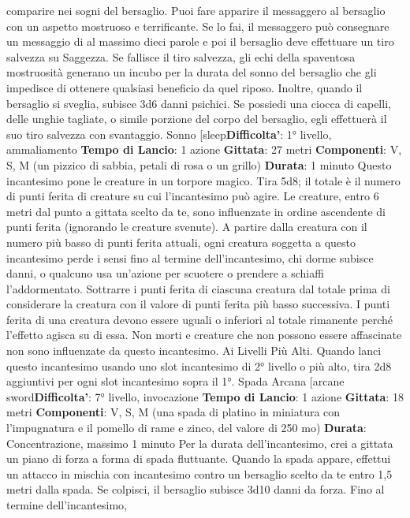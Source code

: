 \begin{multicols}{2}
comparire nei sogni del bersaglio.
Puoi fare apparire il messaggero al bersaglio con un
aspetto mostruoso e terrificante. Se lo fai, il
messaggero può consegnare un messaggio di al
massimo dieci parole e poi il bersaglio deve effettuare
un tiro salvezza su Saggezza. Se fallisce il tiro
salvezza, gli echi della spaventosa mostruosità
generano un incubo per la durata del sonno del
bersaglio che gli impedisce di ottenere qualsiasi
beneficio da quel riposo. Inoltre, quando il bersaglio si
sveglia, subisce 3d6 danni psichici.
Se possiedi una ciocca di capelli, delle unghie tagliate,
o simile porzione del corpo del bersaglio, egli effettuerà
il suo tiro salvezza con svantaggio.
Sonno
[sleep\textbf{Difficolta'}:
1° livello, ammaliamento
\textbf{Tempo di Lancio}: 1 azione
\textbf{Gittata}: 27 metri
\textbf{Componenti}: V, S, M (un pizzico di sabbia, petali di
rosa o un grillo)
\textbf{Durata}: 1 minuto
Questo incantesimo pone le creature in un torpore
magico. Tira 5d8; il totale è il numero di punti ferita di
creature su cui l’incantesimo può agire. Le creature,
entro 6 metri dal punto a gittata scelto da te, sono
influenzate in ordine ascendente di punti ferita
(ignorando le creature svenute).
A partire dalla creatura con il numero più basso di punti
ferita attuali, ogni creatura soggetta a questo
incantesimo perde i sensi fino al termine
dell’incantesimo, chi dorme subisce danni, o qualcuno
usa un’azione per scuotere o prendere a schiaffi
l’addormentato. Sottrarre i punti ferita di ciascuna
creatura dal totale prima di considerare la creatura con
il valore di punti ferita più basso successiva. I punti
ferita di una creatura devono essere uguali o inferiori al
totale rimanente perché l’effetto agisca su di essa.
Non morti e creature che non possono essere
affascinate non sono influenzate da questo
incantesimo.
Ai Livelli Più Alti. Quando lanci questo incantesimo
usando uno slot incantesimo di 2° livello o più alto, tira
2d8 aggiuntivi per ogni slot incantesimo sopra il 1°.
Spada Arcana
[arcane sword\textbf{Difficolta'}:
7° livello, invocazione
\textbf{Tempo di Lancio}: 1 azione
\textbf{Gittata}: 18 metri
\textbf{Componenti}: V, S, M (una spada di platino in miniatura
con l’impugnatura e il pomello di rame e zinco, del
valore di 250 mo)
\textbf{Durata}: Concentrazione, massimo 1 minuto
Per la durata dell’incantesimo, crei a gittata un piano di
forza a forma di spada fluttuante.
Quando la spada appare, effettui un attacco in mischia
con incantesimo contro un bersaglio scelto da te entro
1,5 metri dalla spada. Se colpisci, il bersaglio subisce
3d10 danni da forza. Fino al termine dell’incantesimo,

\end{multicols}
